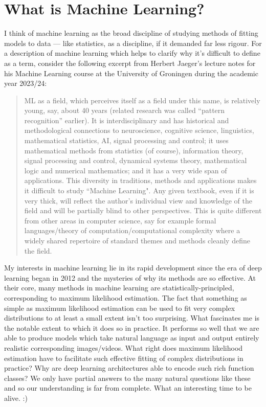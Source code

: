 \documentclass[11pt]{article}
\begin{document}
\section{What is Machine Learning?}
I think of machine learning as the broad discipline of studying methods of fitting models to data — like statistics, as a discipline, if it demanded far less rigour. For a description of machine learning which helps to clarify why it's difficult to define as a term, consider the following excerpt from Herbert Jaeger's lecture notes for his Machine Learning course at the University of Groningen during the academic year 2023/24:
\begin{quotation}
    ML as a ﬁeld, which perceives itself as a ﬁeld under this name, is relatively young, say, about 40 years (related research was called “pattern recognition” earlier). It is interdisciplinary and has historical and methodological connections to neuroscience, cognitive science, linguistics, mathematical statistics, AI, signal processing and control; it uses mathematical methods from statistics (of course), information theory, signal processing and control, dynamical systems theory, mathematical logic and numerical mathematics; and it has a very wide span of applications. This diversity in traditions, methods and applications makes it diﬃcult to study ``Machine Learning". Any given textbook, even if it is very thick, will reﬂect the author's individual view and knowledge of the ﬁeld and will be partially blind to other perspectives. This is quite diﬀerent from other areas in computer science, say for example formal languages/theory of computation/computational complexity where a widely shared repertoire of standard themes and methods cleanly deﬁne the ﬁeld.
\end{quotation}

My interests in machine learning lie in its rapid development since the era of deep learning began in 2012 and the mysteries of why its methods are so effective. At their core, many methods in machine learning are statistically-principled, corresponding to maximum likelihood estimation. The fact that something as simple as maximum likelihood estimation can be used to fit very complex distributions to at least a small extent isn't too surprising. What fascinates me is the notable extent to which it does so in practice. It performs so well that we are able to produce models which take natural language as input and output entirely realistic corresponding images/videos. What right does maximum likelihood estimation have to facilitate such effective fitting of complex distributions in practice? Why are deep learning architectures able to encode such rich function classes? We only have partial answers to the many natural questions like these and so our understanding is far from complete. What an interesting time to be alive. :)
\end{document}
